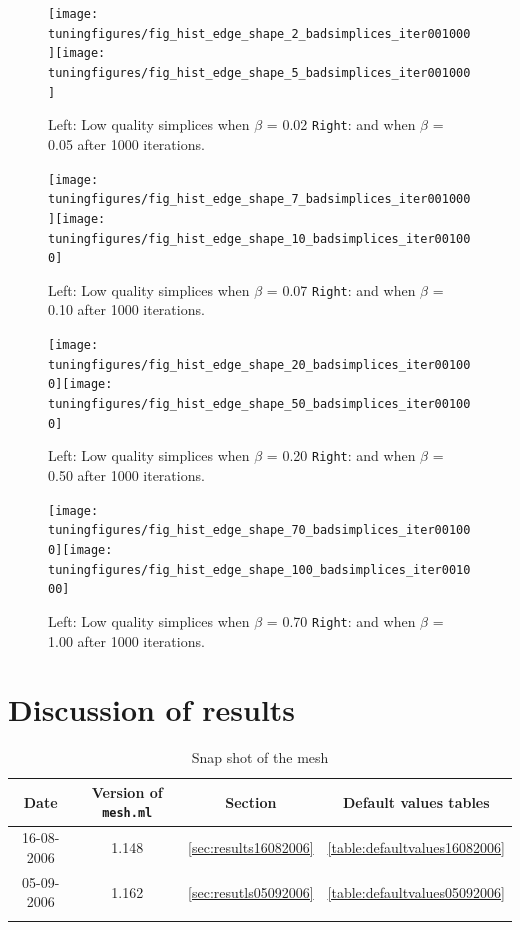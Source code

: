 \documentclass[10pt,a4paper]{book}
\newcommand{\py}[1]{\texttt{\color{blue}#1}}
\begin{document}
\begin{figure}[tbhp]
\centerline{\texttt{[image: tuningfigures/fig\_hist\_edge\_shape\_2\_badsimplices\_iter001000]}\hspace{3cm}\texttt{[image: tuningfigures/fig\_hist\_edge\_shape\_5\_badsimplices\_iter001000]}}
\caption{\label{fig:fig_hist_edge_shape_2_badsimplices_iter001000} Left: Low quality simplices when $\beta$ = 0.02 \texttt{Right}: and when $\beta$ = 0.05 after 1000 iterations.}
\end{figure}

\begin{figure}[tbhp]
\centerline{\texttt{[image: tuningfigures/fig\_hist\_edge\_shape\_7\_badsimplices\_iter001000]}\hspace{3cm}\texttt{[image: tuningfigures/fig\_hist\_edge\_shape\_10\_badsimplices\_iter001000]}}
\caption{\label{fig:fig_hist_edge_shape_7_badsimplices_iter001000} Left: Low quality simplices when $\beta$ = 0.07 \texttt{Right}: and when $\beta$ = 0.10 after 1000 iterations.}
\end{figure}


\begin{figure}[tbhp]
\centerline{\texttt{[image: tuningfigures/fig\_hist\_edge\_shape\_20\_badsimplices\_iter001000]}\hspace{3cm}\texttt{[image: tuningfigures/fig\_hist\_edge\_shape\_50\_badsimplices\_iter001000]}}
\caption{\label{fig:fig_hist_edge_shape_20_badsimplices_iter001000} Left: Low quality simplices when $\beta$ = 0.20 \texttt{Right}: and when $\beta$ = 0.50 after 1000 iterations.}
\end{figure}

\begin{figure}[tbhp]
\centerline{\texttt{[image: tuningfigures/fig\_hist\_edge\_shape\_70\_badsimplices\_iter001000]}\hspace{3cm}\texttt{[image: tuningfigures/fig\_hist\_edge\_shape\_100\_badsimplices\_iter001000]}}
\caption{\label{fig:fig_hist_edge_shape_70_badsimplices_iter001000} Left: Low quality simplices when $\beta$ = 0.70 \texttt{Right}: and when $\beta$ = 1.00 after 1000 iterations.}
\end{figure}


\chapter{Discussion of results}
\label{sec:discussion_edgeresults}

\begin{table}[tbhp]
\caption{Snap shot of the mesh}
\centering
\begin{tabular}{cccc}
\hline
\hline
Date & Version of \py{mesh.ml} & Section & Default values tables\\
\hline
16-08-2006 & 1.148 & \ref{sec:results16082006} & \ref{table:defaultvalues16082006}\\
05-09-2006 & 1.162  & \ref{sec:resutls05092006} & \ref{table:defaultvalues05092006}\\
  &  & & \\
\hline
\end{tabular}
\label{table:revisions}
\end{table}
\end{document}
